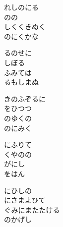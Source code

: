 \documentclass[10pt,b5j]{tarticle} %
\begin{document}
\vspace{1.5em} %
\newcommand{\linespace}{0.5em} %
\newcommand{\blocksize}{0.5\hsize} %
\begin{enumerate} %
    \begin{minipage}[c]{\blocksize}
    
        \vspace{\linespace}
        \item
        れしのにる\\
        のの\\
        しくくきぬく\\
        のにくかな
        
        \vspace{\linespace}
        \item
        るのせに\\
        しぼる\\
        ふみては\\
        るもしまぬ
        
        \vspace{\linespace}
        \item
        きのふぞるに\\
        をひつつ\\
        のゆくの\\
        のにみく
        
        \vspace{\linespace}
        \item
        にふりて\\
        くやのの\\
        がにし\\
        をはん
        
        \vspace{\linespace}
        \item
        にひしの\\
        にさまよひて\\
        ぐみにまたたける\\
        のかげし
    
    \end{minipage}
\end{enumerate} %
\end{document}

